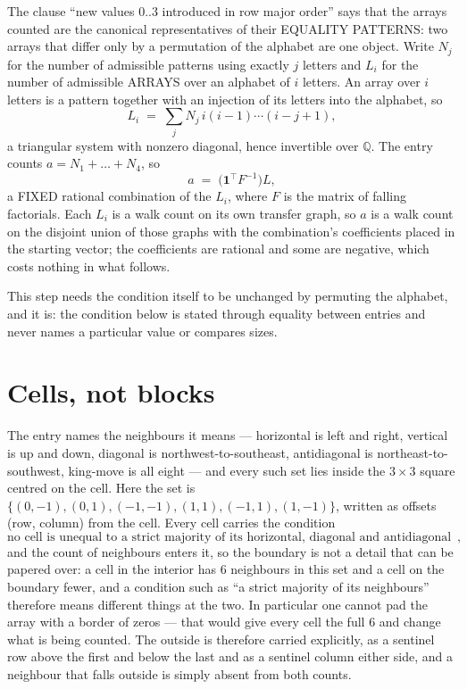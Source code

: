 \documentclass[11pt,a4paper]{article}
\theoremstyle{plain}
\theoremstyle{definition}
\begin{document}
The clause ``new values $0..3$ introduced in row major order'' says that the arrays
counted are the canonical representatives of their EQUALITY PATTERNS: two arrays that differ
only by a permutation of the alphabet are one object. Write $N_j$ for the number of admissible
patterns using exactly $j$ letters and $L_i$ for the number of admissible ARRAYS over an
alphabet of $i$ letters. An array over $i$ letters is a pattern together with an injection of
its letters into the alphabet, so
\[
L_i\;=\;\sum_{j}N_j\,i(i-1)\cdots(i-j+1),
\]
a triangular system with nonzero diagonal, hence invertible over $\mathbb{Q}$. The entry
counts $a=N_1+\dots+N_{4}$, so
\[
a\;=\;\bigl(\mathbf{1}^{\!\top}F^{-1}\bigr)L ,
\]
a FIXED rational combination of the $L_i$, where $F$ is the matrix of falling factorials.
Each $L_i$ is a walk count on its own transfer graph, so $a$ is a walk count on the disjoint
union of those graphs with the combination's coefficients placed in the starting vector; the
coefficients are rational and some are negative, which costs nothing in what follows.

This step needs the condition itself to be unchanged by permuting the alphabet, and it is:
the condition below is stated through equality between entries and never names a particular
value or compares sizes.

\section{Cells, not blocks}

The entry names the neighbours it means --- horizontal is left and right, vertical is up and
down, diagonal is northwest-to-southeast, antidiagonal is northeast-to-southwest, king-move is
all eight --- and every such set lies inside the $3\times3$ square centred on the cell. Here
the set is $\{(0,-1), (0,1), (-1,-1), (1,1), (-1,1), (1,-1)\}$, written as offsets (row, column) from the cell. Every cell carries
the condition
\[
\text{no cell is unequal to a strict majority of its horizontal, diagonal and antidiagonal neighbours},
\]
and the count of neighbours enters it, so the boundary is not a detail that can be papered
over: a cell in the interior has $6$ neighbours in this set and a cell on the boundary
fewer, and a condition such as ``a strict majority of its neighbours'' therefore means
different things at the two. In particular one cannot pad the array with a border of zeros ---
that would give every cell the full $6$ and change what is being counted. The outside is
therefore carried
explicitly, as a sentinel row above the first and below the last and as a sentinel column
either side, and a neighbour that falls outside is simply absent from both counts.
\end{document}
